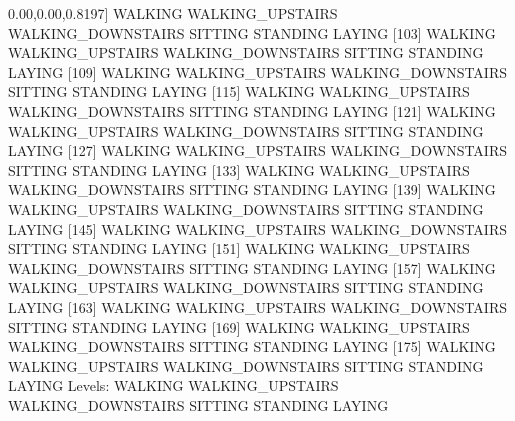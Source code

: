 \documentclass[
]{article}
\newenvironment{Shaded}{\begin{snugshade}}{\end{snugshade}}
\newcommand{\DecValTok}[1]{\textcolor[rgb]{0.00,0.00,0.81}{#1}}
\newcommand{\NormalTok}[1]{#1}
\newcommand{\SpecialCharTok}[1]{\textcolor[rgb]{0.00,0.00,0.00}{#1}}
\begin{document}
\begin{Shaded}
\begin{Highlighting}[]
\NormalTok{ [}\DecValTok{97}\NormalTok{] WALKING            WALKING\_UPSTAIRS   WALKING\_DOWNSTAIRS SITTING            STANDING           LAYING            }
\NormalTok{[}\DecValTok{103}\NormalTok{] WALKING            WALKING\_UPSTAIRS   WALKING\_DOWNSTAIRS SITTING            STANDING           LAYING            }
\NormalTok{[}\DecValTok{109}\NormalTok{] WALKING            WALKING\_UPSTAIRS   WALKING\_DOWNSTAIRS SITTING            STANDING           LAYING            }
\NormalTok{[}\DecValTok{115}\NormalTok{] WALKING            WALKING\_UPSTAIRS   WALKING\_DOWNSTAIRS SITTING            STANDING           LAYING            }
\NormalTok{[}\DecValTok{121}\NormalTok{] WALKING            WALKING\_UPSTAIRS   WALKING\_DOWNSTAIRS SITTING            STANDING           LAYING            }
\NormalTok{[}\DecValTok{127}\NormalTok{] WALKING            WALKING\_UPSTAIRS   WALKING\_DOWNSTAIRS SITTING            STANDING           LAYING            }
\NormalTok{[}\DecValTok{133}\NormalTok{] WALKING            WALKING\_UPSTAIRS   WALKING\_DOWNSTAIRS SITTING            STANDING           LAYING            }
\NormalTok{[}\DecValTok{139}\NormalTok{] WALKING            WALKING\_UPSTAIRS   WALKING\_DOWNSTAIRS SITTING            STANDING           LAYING            }
\NormalTok{[}\DecValTok{145}\NormalTok{] WALKING            WALKING\_UPSTAIRS   WALKING\_DOWNSTAIRS SITTING            STANDING           LAYING            }
\NormalTok{[}\DecValTok{151}\NormalTok{] WALKING            WALKING\_UPSTAIRS   WALKING\_DOWNSTAIRS SITTING            STANDING           LAYING            }
\NormalTok{[}\DecValTok{157}\NormalTok{] WALKING            WALKING\_UPSTAIRS   WALKING\_DOWNSTAIRS SITTING            STANDING           LAYING            }
\NormalTok{[}\DecValTok{163}\NormalTok{] WALKING            WALKING\_UPSTAIRS   WALKING\_DOWNSTAIRS SITTING            STANDING           LAYING            }
\NormalTok{[}\DecValTok{169}\NormalTok{] WALKING            WALKING\_UPSTAIRS   WALKING\_DOWNSTAIRS SITTING            STANDING           LAYING            }
\NormalTok{[}\DecValTok{175}\NormalTok{] WALKING            WALKING\_UPSTAIRS   WALKING\_DOWNSTAIRS SITTING            STANDING           LAYING            }
\NormalTok{Levels}\SpecialCharTok{:}\NormalTok{ WALKING WALKING\_UPSTAIRS WALKING\_DOWNSTAIRS SITTING STANDING LAYING}
\end{Highlighting}
\end{Shaded}
\end{document}
